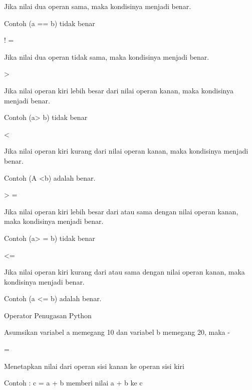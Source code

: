 \noindent 
Jika nilai dua operan sama, maka kondisinya menjadi benar. \par
\noindent 
Contoh (a == b) tidak benar \par
\vspace{12pt}
\noindent 
! = \par
\noindent 
Jika nilai dua operan tidak sama, maka kondisinya menjadi benar. \par
\vspace{12pt}
\noindent 
> \par
\noindent 
Jika nilai operan kiri lebih besar dari nilai operan kanan, maka kondisinya menjadi benar. \par
\noindent 
Contoh (a> b) tidak benar \par
\vspace{12pt}
\noindent 
< \par
\noindent 
Jika nilai operan kiri kurang dari nilai operan kanan, maka kondisinya menjadi benar. \par
\noindent 
Contoh (A <b) adalah benar. \par
\vspace{12pt}
\noindent 
> = \par
\noindent 
Jika nilai operan kiri lebih besar dari atau sama dengan nilai operan kanan, maka kondisinya menjadi benar. \par
\noindent 
Contoh (a> = b) tidak benar \par
\vspace{12pt}
\noindent 
<= \par
\noindent 
Jika nilai operan kiri kurang dari atau sama dengan nilai operan kanan, maka kondisinya menjadi benar. \par
\noindent 
Contoh (a <= b) adalah benar. \par
\vspace{12pt}
\noindent 
Operator Penugasan Python \par
\vspace{12pt}
\noindent 
Asumsikan variabel a memegang 10 dan variabel b memegang 20, maka - \par
\vspace{12pt}
\noindent 
= \par
\noindent 
Menetapkan nilai dari operan sisi kanan ke operan sisi kiri \hspace*{4.41in}  \par
\noindent 
Contoh : c = a + b memberi nilai a + b ke c \par
\noindent 
\vspace{12pt}
\noindent 
